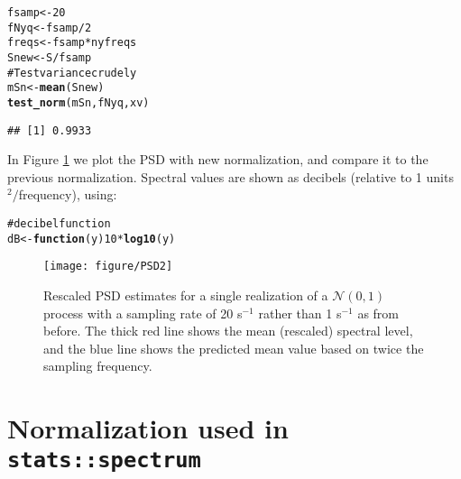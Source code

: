 \documentclass[12pt]{article}\usepackage{graphicx, color}
\makeatletter
\def\maxwidth{ %
  \ifdim\Gin@nat@width>\linewidth
    \linewidth
  \else
    \Gin@nat@width
  \fi
}
\newcommand{\hlfunctioncall}[1]{\textcolor[rgb]{0.501960784313725,0,0.329411764705882}{\textbf{#1}}}%
\newcommand{\hlcomment}[1]{\textcolor[rgb]{0.180392156862745,0.6,0.341176470588235}{#1}}%
\newenvironment{kframe}{%
 \def\at@end@of@kframe{}%
 \ifinner\ifhmode%
  \def\at@end@of@kframe{\end{minipage}}%
  \begin{minipage}{\columnwidth}%
 \fi\fi%
 \def\FrameCommand##1{\hskip\@totalleftmargin \hskip-\fboxsep
 \colorbox{shadecolor}{##1}\hskip-\fboxsep
     \hskip-\linewidth \hskip-\@totalleftmargin \hskip\columnwidth}%
 \MakeFramed {\advance\hsize-\width
   \@totalleftmargin\z@ \linewidth\hsize
   \@setminipage}}%
 {\par\unskip\endMakeFramed%
 \at@end@of@kframe}
\newenvironment{knitrout}{}{} %
\newcommand{\Rcmd}[1]{\texttt{#1}}
\makeatother
\begin{document}
\begin{knitrout}
\color{fgcolor}\begin{kframe}
\begin{alltt}
fsamp <- 20
fNyq <- fsamp/2
freqs <- fsamp * nyfreqs
Snew <- S/fsamp
\hlcomment{# Test variance crudely}
mSn <- \hlfunctioncall{mean}(Snew)
\hlfunctioncall{test_norm}(mSn, fNyq, xv)
\end{alltt}
\begin{verbatim}
## [1] 0.9933
\end{verbatim}
\end{kframe}
\end{knitrout}


In Figure \ref{fig:psdsamp} we
plot the PSD with new normalization, and compare it to
the previous normalization.
Spectral values are shown as
decibels (relative to 1 units$^2/$frequency), using:

\begin{knitrout}
\color{fgcolor}\begin{kframe}
\begin{alltt}
\hlcomment{# decibel function}
dB <- \hlfunctioncall{function}(y) 10 * \hlfunctioncall{log10}(y)
\end{alltt}
\end{kframe}
\end{knitrout}

\begin{figure}[htb!]
\begin{center}
\begin{knitrout}
\color{fgcolor}
\texttt{[image: figure/PSD2]} 

\end{knitrout}

\caption{Rescaled PSD estimates for a single realization of a 
$\mathcal{N}(0,1)$ process with a sampling rate of 20 s$^{-1}$ rather
than 1 s$^{-1}$ as from before.  
The thick red line shows the mean (rescaled) spectral level, and the
blue line shows the predicted mean value based on twice the sampling
frequency.}
\label{fig:psdsamp}
\end{center}
\end{figure}

\section{Normalization used in \Rcmd{stats::spectrum}}
\end{document}
